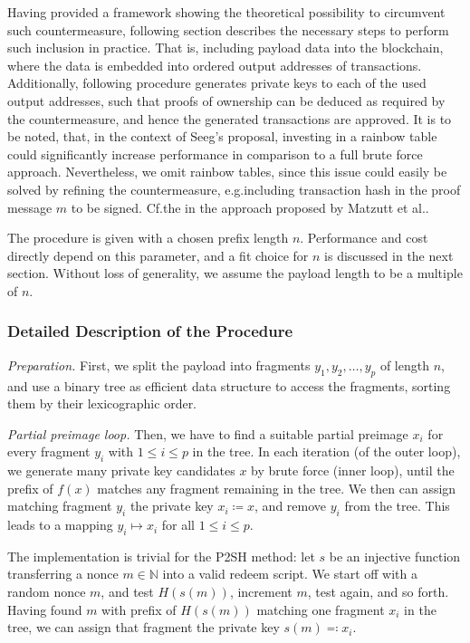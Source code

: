 \documentclass[a4paper,11pt,titlepage]{scrbook}
\begin{document}
Having provided a framework showing the theoretical possibility to circumvent such countermeasure, following section describes the necessary steps to perform such inclusion in practice.
That is, including payload data into the blockchain, where the data is embedded into ordered output addresses of transactions.
Additionally, following procedure generates private keys to each of the used output addresses, such that proofs of ownership can be deduced as required by the countermeasure, and hence the generated transactions are approved.
It is to be noted, that, in the context of Seeg's proposal, investing in a rainbow table could significantly increase performance in comparison to a full brute force approach.
Nevertheless, we omit rainbow tables, since this issue could easily be solved by refining the countermeasure, e.g.\@ including transaction hash in the proof message $m$ to be signed.
Cf.\@ the  in the approach proposed by Matzutt et al.\@ \cite[368--369]{matzutt_thwarting_2018}.

The procedure is given with a chosen prefix length $n$. Performance and cost directly depend on this parameter, and a fit choice for $n$ is discussed in the next section.
Without loss of generality, we assume the payload length to be a multiple of $n$.

\subsubsection*{Detailed Description of the Procedure}

\emph{Preparation.} First, we split the payload into fragments $y_1, y_2, \dots, y_p$ of length $n$, and use a binary tree as efficient data structure to access the fragments, sorting them by their lexicographic order.

\emph{Partial preimage loop.}
Then, we have to find a suitable partial preimage $x_i$ for every fragment $y_i$ with $1\leq i \leq p$ in the tree.
In each iteration (of the outer loop), we generate many private key candidates $x$ by brute force (inner loop), until the prefix of $f(x)$ matches any fragment remaining in the tree.
We then can assign matching fragment $y_i$ the private key $x_i \coloneqq x$, and remove $y_i$ from the tree.
This leads to a mapping $y_i \mapsto x_i$ for all $1\leq i\leq p$.

The implementation is trivial for the P2SH method: let $s$ be an injective function transferring a nonce $m\in\mathbb{N}$ into a valid redeem script.
We start off with a random nonce $m$, and test $H(s(m))$, increment $m$, test again, and so forth.
Having found $m$ with prefix of $H(s(m))$ matching one fragment $x_i$ in the tree, we can assign that fragment the private key $s(m)\eqqcolon x_i$.
\end{document}
